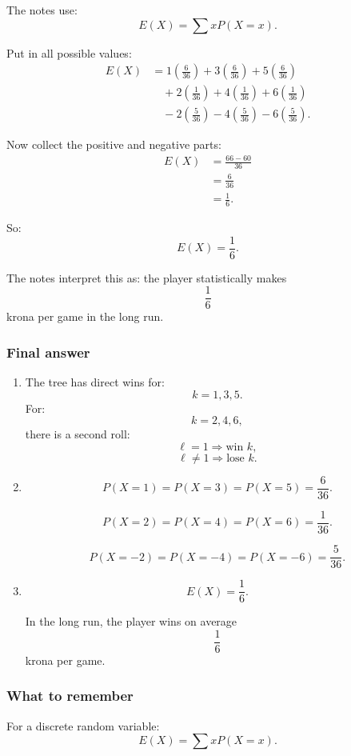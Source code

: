 \documentclass[10pt]{article}
\begin{document}
The notes use:
\[
E(X)=\sum xP(X=x).
\]

Put in all possible values:
\begin{align*}
E(X)
&=
1\left(\frac{6}{36}\right)
+3\left(\frac{6}{36}\right)
+5\left(\frac{6}{36}\right)
\\
&\quad
+2\left(\frac{1}{36}\right)
+4\left(\frac{1}{36}\right)
+6\left(\frac{1}{36}\right)
\\
&\quad
-2\left(\frac{5}{36}\right)
-4\left(\frac{5}{36}\right)
-6\left(\frac{5}{36}\right).
\end{align*}

Now collect the positive and negative parts:
\begin{align*}
E(X)
&=
\frac{66-60}{36}
\\[2mm]
&=
\frac{6}{36}
\\[2mm]
&=
\frac{1}{6}.
\end{align*}

So:
\[
E(X)=\frac{1}{6}.
\]

The notes interpret this as:
the player statistically makes
\[
\frac{1}{6}
\]
krona per game in the long run.

\subsubsection*{Final answer}

\begin{enumerate}[label=\alph*)]
\item
The tree has direct wins for:
\[
k=1,3,5.
\]
For:
\[
k=2,4,6,
\]
there is a second roll:
\[
\ell=1 \Rightarrow \text{win }k,
\]
\[
\ell\ne 1 \Rightarrow \text{lose }k.
\]

\item
\[
P(X=1)=P(X=3)=P(X=5)=\frac{6}{36}.
\]

\[
P(X=2)=P(X=4)=P(X=6)=\frac{1}{36}.
\]

\[
P(X=-2)=P(X=-4)=P(X=-6)=\frac{5}{36}.
\]

\item
\[
E(X)=\frac{1}{6}.
\]

In the long run, the player wins on average
\[
\frac{1}{6}
\]
krona per game.
\end{enumerate}

\subsubsection*{What to remember}

For a discrete random variable:
\[
E(X)=\sum xP(X=x).
\]
\end{document}
